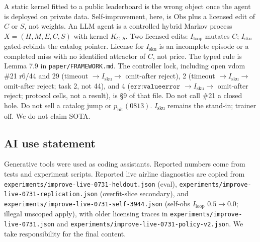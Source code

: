 \documentclass{article}
\begin{document}
A static kernel fitted to a public leaderboard is the wrong object once the agent is deployed on private data. Self-improvement, here, is \(\mathrm{Obs}\) plus a licensed edit of \(C\) or \(S\), not weights. An LLM agent is a controlled hybrid Markov process \(X=(H,M,E,C,S)\) with kernel \(K_{C,S}\). Two licensed edits: \(I_{\mathrm{loop}}\) mutates \(C\); \(I_{\mathrm{sku}}\) gated-rebinds the catalog pointer. License for \(I_{\mathrm{sku}}\) is an incomplete episode or a completed miss with no identified attractor of \(C\), not price. The typed rule is Lemma 7.9 in \texttt{paper/FRAMEWORK.md}. The controller lock, including open vdom \#21 r6/44 and 29 (timeout \(\to I_{\mathrm{sku}}\to\) omit-after reject), 2 (timeout \(\to I_{\mathrm{sku}}\to\) omit-after reject; task 2, not 44), and 4 (\(\texttt{err:valueerror}\) \(\to I_{\mathrm{sku}}\to\) omit-after reject; protocol cells, not a result), is \S9 of that file. Do not call \#21 a closed hole. Do not sell a catalog jump or \(p_{\mathrm{hit}}(0813)\). \(I_{\mathrm{sku}}\) remains the stand-in; trainer off. We do not claim SOTA.

\subsection*{AI use statement}
Generative tools were used as coding assistants. Reported numbers come from tests and experiment scripts. Reported live airline diagnostics are copied from \texttt{experiments/improve-live-0731-heldout.json} (eval), \texttt{experiments/improve-live-0731-replication.json} (overfit-slice secondary), and \texttt{experiments/improve-live-0731-self-3944.json} (self-obs \(I_{\mathrm{loop}}\) \(0.5\to 0.0\); illegal unscoped apply), with older licensing traces in \texttt{experiments/improve-live-0731.json} and \texttt{experiments/improve-live-0731-policy-v2.json}. We take responsibility for the final content.
\end{document}
